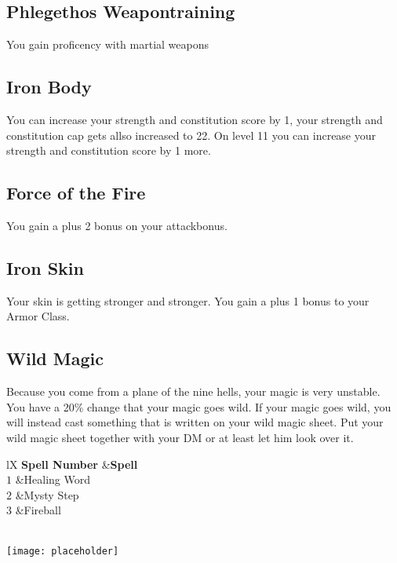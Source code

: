 \documentclass[a4paper,10pt,twoside,twocolumn]{dndbook} %
\begin{document}
	\subsection{Phlegethos Weapontraining}
	You gain proficency with martial weapons
	\subsection{Iron Body}
	You can increase your strength and constitution score by 1, your strength and constitution cap gets allso increased to 22.\linebreak
	On level 11 you can increase your strength and constitution score by 1 more.
	\subsection{Force of the Fire}
	You gain a plus 2 bonus on your attackbonus.
	\subsection{Iron Skin}
	Your skin is getting stronger and stronger. You gain a plus 1 bonus to your Armor Class.
	\subsection{Wild Magic}
	Because you come from a plane of the nine hells, your magic is very unstable. You have a 20\% change that your magic goes wild. If your magic goes wild, you will instead cast something that is written on your wild magic sheet. Put your wild magic sheet together with your DM or at least let him look over it.
	
	\begin{DndTable}[header=Spells]{lX}
		\textbf{Spell Number}	&\textbf{Spell}\\
		$1$						&Healing Word\\
		$2$						&Mysty Step\\
		$3$						&Fireball\\
	\end{DndTable}
	\vspace{2cm}\\\hspace*{2cm}\texttt{[image: placeholder]}
\end{document}
